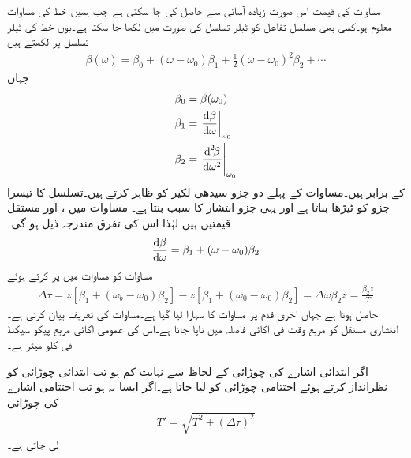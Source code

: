 مساوات  کی قیمت اس صورت زیادہ آسانی سے حاصل کی جا سکتی ہے جب ہمیں  خط کی مساوات  معلوم ہو۔کسی بھی مسلسل تفاعل کو ٹیلر تسلسل کی صورت میں لکھا جا
 سکتا ہے۔یوں  خط کی ٹیلر تسلسل  پر لکھتے ہیں
\begin{align}\label{مساوات_ترچھی_انتشار_کی_ٹیلر_تسلسل}
\beta(\omega)= \beta_0+(\omega-\omega_0)\beta_1+\frac{1}{2}(\omega-\omega_0)^2 \beta_2 +\cdots
\end{align}
جہاں
\begin{align}
\beta_0&=\beta(\omega_0)\\
\beta_1&=\left. \frac{\dif \beta}{\dif \omega} \right|_{\omega_0}\\
\beta_2&=\left. \frac{\dif ^{\,2} \!\!\beta}{\dif \omega^2} \right|_{\omega_0}\label{مساوات_ترچھی_انتشار_کا_مستقل}
\end{align}
کے برابر ہیں۔مساوات  کے پہلے دو جزو سیدھی لکیر کو ظاہر کرتے ہیں۔تسلسل کا تیسرا جزو  کو ٹیڑھا  بناتا ہے اور یہی جزو انتشار کا سبب بنتا ہے۔ مساوات  میں ،  اور  مستقل قیمتیں ہیں لہٰذا اس کی تفرق مندرجہ ذیل ہو گی۔
\begin{align}\label{مساوات_ترچھی_انتشار_ب}
\frac{\dif \beta}{\dif \omega}=\beta_1+(\omega-\omega_0)\beta_2
\end{align}
مساوات  کو مساوات  میں پر کرتے ہوئے
\begin{align}
\Delta \tau=z [\beta_1+(\omega_b-\omega_0)\beta_2]-z [\beta_1+(\omega_0-\omega_0)\beta_2]=\Delta \omega \beta_2 z=\frac{\beta_2 z}{T}
\end{align}
حاصل ہوتا ہے جہاں آخری قدم پر مساوات  کا سہارا لیا گیا ہے۔مساوات    کی تعریف بیان کرتی ہے۔ انتشاری مستقل کو مربع وقت فی اکائی فاصلہ میں ناپا جاتا ہے۔اس کی عمومی اکائی مربع پیکو سیکنڈ فی کلو میٹر  ہے۔

اگر ابتدائی اشارے کی چوڑائی  کے لحاظ  سے نہایت کم ہو تب ابتدائی چوڑائی کو نظرانداز کرتے ہوئے اختتامی چوڑائی کو  لیا جاتا ہے۔اگر ایسا نہ ہو تب اختتامی اشارے کی چوڑائی
\begin{align}
T'=\sqrt{T^2+(\Delta \tau)^2}
\end{align}
لی جاتی ہے۔


